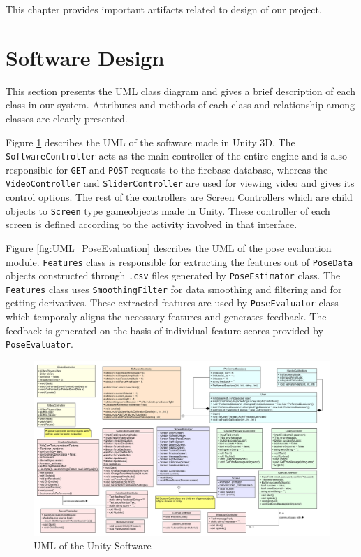 This chapter provides important artifacts related to design of our project.

\section{Software Design}

This section presents the UML class diagram and gives a brief description of each class in our system. Attributes and methods of each class and relationship among classes are clearly presented.

Figure \ref{fig:UML_Unity} describes the UML of the software made in Unity 3D. The \texttt{SoftwareController} acts as the main controller of the entire engine and is also responsible for \texttt{GET} and \texttt{POST} requests to the firebase database, whereas the \texttt{VideoController} and \texttt{SliderController} are used for viewing video and gives its control options. The rest of the controllers are Screen Controllers which are child objects to \texttt{Screen} type gameobjects made in Unity. These controller of each screen is defined according to the activity involved in that interface. 

Figure \ref{fig:UML_PoseEvaluation} describes the UML of the pose evaluation module. \texttt{Features} class is responsible for extracting the features out of \texttt{PoseData} objects constructed through \texttt{.csv} files generated by \texttt{PoseEstimator} class. The \texttt{Features} class uses \texttt{SmoothingFilter} for data smoothing and filtering and for getting derivatives. These extracted features are used by \texttt{PoseEvaluator} class which temporaly aligns the necessary features and generates feedback. The feedback is generated on the basis of individual feature scores provided by \texttt{PoseEvaluator}. 

\begin{figure}
  \centering
  \includegraphics[scale=0.3]{images/UML - Unity Software.png}
  \caption{UML of the Unity Software}
  \label{fig:UML_Unity}
\end{figure}

